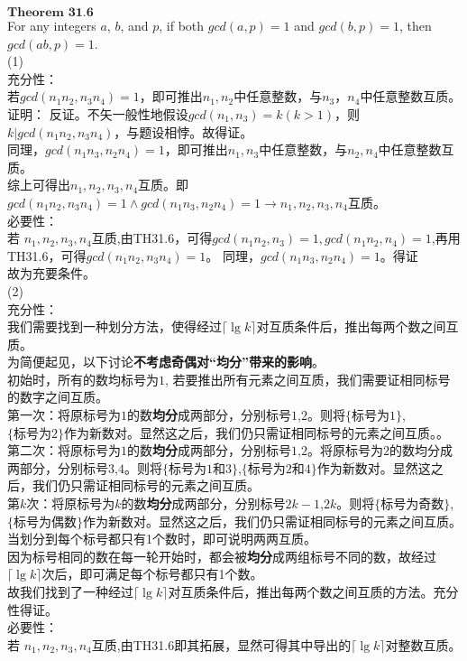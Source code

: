 \documentclass[a4paper, justified]{tufte-handout}
\begin{document}
\begin{solution}
$\textbf{Theorem 31.6}$\\
For any integers $a$, $b$, and $p$, if both $gcd(a,p)=1$ and $gcd(b,p)=1$, then $gcd(ab,p)=1$.\\
(1)\\
充分性：\\
若$gcd(n_1n_2,n_3n_4)=1$，即可推出$n_1,n_2$中任意整数，与$n_3，n_4$中任意整数互质。\\
证明： 反证。不矢一般性地假设$gcd(n_1,n_3)=k(k>1)$，则$k|gcd(n_1n_2,n_3n_4)$，与题设相悖。故得证。\\
同理，$gcd(n_1n_3,n_2n_4)=1$，即可推出$n_1,n_3$中任意整数，与$n_2,n_4$中任意整数互质。\\
综上可得出$n_1,n_2,n_3,n_4$互质。即$gcd(n_1n_2,n_3n_4)=1\land gcd(n_1n_3,n_2n_4)=1\to n_1,n_2,n_3,n_4$互质。\\
必要性：\\
若 $n_1,n_2,n_3,n_4$互质,由TH31.6，可得$gcd(n_1n_2,n_3)=1,gcd(n_1n_2,n_4)=1$,再用TH31.6，可得$gcd(n_1n_2,n_3n_4)=1$。
同理，$gcd(n_1n_3,n_2n_4)=1$。得证\\
故为充要条件。\\
(2)\\
充分性：\\
我们需要找到一种划分方法，使得经过$\lceil\lg k\rceil$对互质条件后，推出每两个数之间互质。\\
为简便起见，以下讨论\textbf{不考虑奇偶对“均分”带来的影响}。\\
初始时，所有的数均标号为$1$, 若要推出所有元素之间互质，我们需要证相同标号的数字之间互质。\\
第一次：将原标号为$1$的数\textbf{均分}成两部分，分别标号$1$,$2$。则将$\{\text{标号为1}\}$,$\{\text{标号为2}\}$作为新数对。显然这之后，我们仍只需证相同标号的元素之间互质。。\\
第二次：将原标号为$1$的数\textbf{均分}成两部分，分别标号$1$,$2$。将原标号为$2$的数均分成两部分，分别标号$3$,$4$。则将$\{\text{标号为1和3}\}$,$\{\text{标号为2和4}\}$作为新数对。显然这之后，我们仍只需证相同标号的元素之间互质。\\
第$k$次：将原标号为$k$的数\textbf{均分}成两部分，分别标号$2k-1$,$2k$。则将$\{\text{标号为奇数}\}$,\\$\{\text{标号为偶数}\}$作为新数对。显然这之后，我们仍只需证相同标号的元素之间互质。\\
当划分到每个标号都只有1个数时，即可说明两两互质。\\
因为标号相同的数在每一轮开始时，都会被\textbf{均分}成两组标号不同的数，故经过$\lceil\lg k\rceil$次后，即可满足每个标号都只有1个数。\\
故我们找到了一种经过$\lceil\lg k\rceil$对互质条件后，推出每两个数之间互质的方法。充分性得证。\\

\noindent 必要性：\\
若 $n_1,n_2,n_3,n_4$互质,由TH31.6即其拓展，显然可得其中导出的$\lceil \lg k \rceil$对整数互质。\\

\end{solution}
\end{document}
